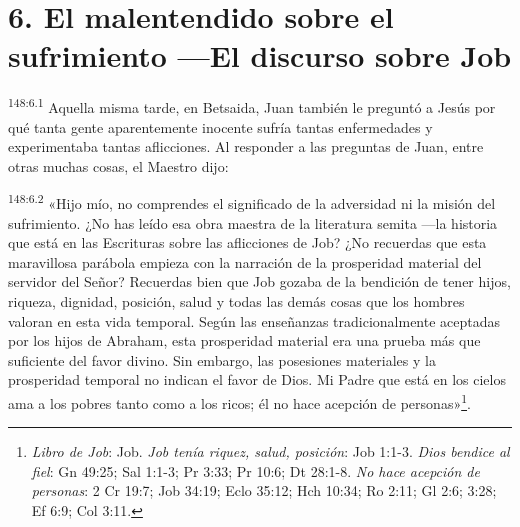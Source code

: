 \section*{6. El malentendido sobre el sufrimiento ---El discurso sobre Job}
\par 
\textsuperscript{148:6.1} Aquella misma tarde, en Betsaida, Juan también le preguntó a Jesús por qué tanta gente aparentemente inocente sufría tantas enfermedades y experimentaba tantas aflicciones. Al responder a las preguntas de Juan, entre otras muchas cosas, el Maestro dijo:

\par 
\textsuperscript{148:6.2} «Hijo mío, no comprendes el significado de la adversidad ni la misión del sufrimiento. ¿No has leído esa obra maestra de la literatura semita ---la historia que está en las Escrituras sobre las aflicciones de Job? ¿No recuerdas que esta maravillosa parábola empieza con la narración de la prosperidad material del servidor del Señor? Recuerdas bien que Job gozaba de la bendición de tener hijos, riqueza, dignidad, posición, salud y todas las demás cosas que los hombres valoran en esta vida temporal. Según las enseñanzas tradicionalmente aceptadas por los hijos de Abraham, esta prosperidad material era una prueba más que suficiente del favor divino. Sin embargo, las posesiones materiales y la prosperidad temporal no indican el favor de Dios. Mi Padre que está en los cielos ama a los pobres tanto como a los ricos; él no hace acepción de personas»\footnote{\textit{Libro de Job}: Job. \textit{Job tenía riquez, salud, posición}: Job 1:1-3. \textit{Dios bendice al fiel}: Gn 49:25; Sal 1:1-3; Pr 3:33; Pr 10:6; Dt 28:1-8. \textit{No hace acepción de personas}: 2 Cr 19:7; Job 34:19; Eclo 35:12; Hch 10:34; Ro 2:11; Gl 2:6; 3:28; Ef 6:9; Col 3:11.}.

